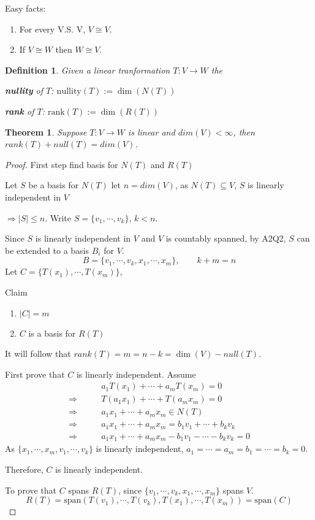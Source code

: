 \documentclass[12pt]{article}
\newtheorem{theorem}{Theorem}[subsection]
\newtheorem{definition}{Definition}[subsection]
\newcommand{\Span}{\mathrm{span}}
\newcommand{\rank}{\mathrm{rank}}
\newcommand{\nullity}{\mathrm{nullity}}
\newcommand{\abs}[1]{\left| #1 \right|}
\begin{document}
	Easy facts: 
	\begin{enumerate}
		\item For every V.S. V, $V\cong V$. 
		\item If $V \cong W$ then $W\cong V$.
	\end{enumerate}

	\begin{definition}
		Given a linear tranformation $T : V\to W$ the
		\begin{description}
			\item \textbf{nullity} of $T$: $\nullity(T) := \dim(N(T))$
			\item \textbf{rank} of $T$: $\rank(T) := \dim(R(T))$ 
		\end{description}
	\end{definition}

	\begin{theorem}
		Suppose $T: V \to W$ is linear and $dim (V) < \infty$, 
		then $rank(T) + null(T) = dim(V)$. 
	\end{theorem}
	\begin{proof}
		First step find basis for $N(T)$ and $R(T)$

		Let $S$ be a basis for $N(T)$ let $n = dim (V)$, as $N(T)\subseteq V$, 
		$S$ is linearly independent in $V$ 

		$\Rightarrow |S|\leq n$. Write $S = \{v_1, \cdots, v_k\}$, $k<n$. 
		
		Since $S$ is linearly independent in $V$ and $V$ is countably spanned,
		by A2Q2, $S$ can be extended to a basis $B_i$ for $V$. 
		\[
			B = \{v_1, \cdots, v_k, x_1, \cdots, x_m\}, \qquad
			k + m = n
		\]
		Let $C = \{T(x_1), \cdots, T(x_m)\}$, 

		Claim
		\begin{enumerate}
			\item $\abs{C} = m$
			\item $C$ is a basis for $R(T)$ 
		\end{enumerate}
		
		It will follow that $rank(T) = m = n - k = \dim(V) - null(T)$. 

		First prove that $C$ is linearly independent. 
		Assume 
		\begin{align*}
			&a_1T(x_1)+ \cdots + a_mT(x_m) = 0\\
			\Rightarrow \qquad 
			& T(a_1x_1)+\cdots+T(a_mx_m) = 0\\
			\Rightarrow \qquad 
			& a_1x_1 + \cdots + a_mx_m \in N(T)\\
			\Rightarrow \qquad 
			& a_1x_1 + \cdots + a_mx_m = b_1 v_1 + \cdots + b_kv_k\\
			\Rightarrow \qquad 
			& a_1x_1 + \cdots + a_mx_m - b_1 v_1 - \cdots - b_kv_k = 0
		\end{align*}
		As $\{x_1, \cdots, x_m, v_1, \cdots, v_k\}$ is linearly independent,
		$a_1= \cdots= a_m = b_1= \cdots= b_k = 0$.

		Therefore, $C$ is linearly independent. 
		
		To prove that $C$ spans $R(T)$, since $\{v_1, \cdots, v_k, x_1,\cdots,
		x_m\}$ spans $V$. 
		\[
			R(T)=\Span(T(v_1), \cdots, T(v_k), T(x_1), \cdots, T(x_m))
			=\Span(C)
		\]
	\end{proof}
\end{document}

